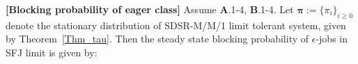 {%
   


\begin{thm} \textbf{[Blocking probability of eager class]} 
\label{Thm_PB}
Assume {\bf A}.1-4, {\bf B}.1-4.
Let ${{\bm \pi}} := \{{\pi}_{i} \}_{i \geq
  0}$ denote the stationary distribution of SDSR-M/M/1 limit tolerant
system, given by Theorem~\ref{Thm_tau}.
Then the steady state blocking probability of $\epsilon$-jobs in SFJ
limit is given by:


\end{thm}}
